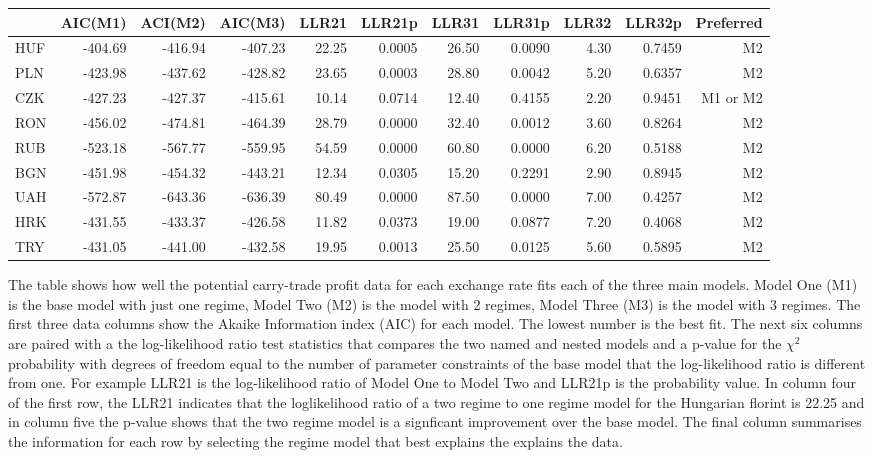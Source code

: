 \documentclass[12pt, a4paper, oneside]{article}\usepackage[]{graphicx}\usepackage[]{color}
\begin{document}
\begin{sidewaystable}[p]
\begin{threeparttable}
\centering
\begin{tabular}{l|rrrrrrrrrr}
  \hline
 & AIC(M1) & ACI(M2) & AIC(M3) & LLR21 & LLR21p & LLR31 & LLR31p & LLR32 & LLR32p & Preferred\\ 
  \hline HUF & -404.69 & -416.94 & -407.23 & 22.25 & 0.0005 & 26.50 & 0.0090 & 4.30 & 0.7459 & M2\\  PLN & -423.98 & -437.62 & -428.82 & 23.65 & 0.0003 & 28.80 & 0.0042 & 5.20 & 0.6357 & M2\\  CZK & -427.23 & -427.37 & -415.61 & 10.14 & 0.0714 & 12.40 & 0.4155 & 2.20 & 0.9451 & M1 or M2\\  RON & -456.02 & -474.81 & -464.39 & 28.79 & 0.0000 & 32.40 & 0.0012 & 3.60 & 0.8264 & M2\\  RUB & -523.18 & -567.77 & -559.95 & 54.59 & 0.0000 & 60.80 & 0.0000 & 6.20 & 0.5188 & M2\\  BGN & -451.98 & -454.32 & -443.21 & 12.34 & 0.0305 & 15.20 & 0.2291 & 2.90 & 0.8945 & M2\\  UAH & -572.87 & -643.36 & -636.39 & 80.49 & 0.0000 & 87.50 & 0.0000 & 7.00 & 0.4257 & M2\\ 
  HRK & -431.55 & -433.37 & -426.58 & 11.82 & 0.0373 & 19.00 & 0.0877 & 7.20 & 0.4068 & M2\\ 
  TRY & -431.05 & -441.00 & -432.58 & 19.95 & 0.0013 & 25.50 & 0.0125 & 5.60 & 0.5895 & M2\\ 
   \hline
\end{tabular}
\begin{tablenotes}
\small
\item The table shows how well the potential carry-trade profit data for each exchange rate fits each of the three main models. Model One (M1) is the base model with just one regime, Model Two (M2) is the model with 2 regimes, Model Three (M3) is the model with 3 regimes.  The first three data columns show the Akaike Information index (AIC) for each model.  The lowest number is the best fit.  The next six columns are paired with a the log-likelihood ratio test statistics that compares the two named and nested models and a p-value for the $\chi^2$ probability with degrees of freedom equal to the number of parameter constraints of the base model that the log-likelihood ratio is different from one.  For example LLR21 is the log-likelihood ratio of Model One to Model Two and LLR21p is the probability value.  In column four of the first row, the LLR21 indicates that the loglikelihood ratio of a two regime to one regime model for the Hungarian florint is 22.25 and in column five the p-value shows that the two regime model is a signficant improvement over the base model. The final column summarises the information for each row by selecting the regime model that best explains the explains the data.  

\end{tablenotes}
\end{threeparttable}
\end{sidewaystable}
\end{document}
